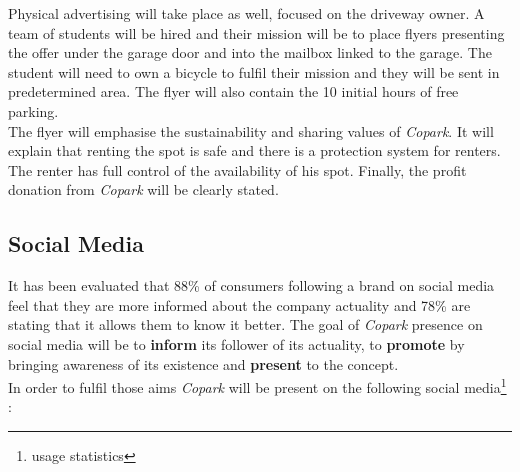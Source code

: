 \documentclass[12pt,a4paper,oneside]{book}
\newcommand{\bp}{\textit{Copark}}
\begin{document}
Physical advertising will take place as well, focused on the driveway owner. A team of students will be hired and their mission will be to place flyers presenting the offer under the garage door and into the mailbox linked to the garage. The student will need to own a bicycle to fulfil their mission and they will be sent in predetermined area. The flyer will also contain the 10 initial hours of free parking.\\

The flyer will emphasise the sustainability and sharing values of \bp{}. It will explain that renting the spot is safe and there is a protection system for renters. The renter has full control of the availability of his spot. Finally, the profit donation from \bp{} will be clearly stated.

\subsection{Social Media}
It has been evaluated that 88\% of consumers following a brand on social media feel that they are more informed about the company actuality and  78\% are stating that it allows them to know it better.\cite{sminfo} The goal of \bp{} presence on social media will be to \textbf{inform} its follower of its actuality, to \textbf{promote} by bringing awareness of its existence and \textbf{present} to the concept.\\

In order to fulfil those aims \bp{} will be present on the following social media\footnote{usage statistics\cite{smusage}} :
\end{document}
